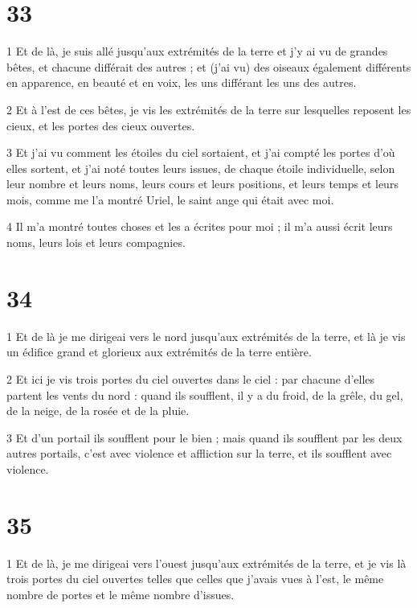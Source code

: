 \chapter{33}

\par 1 Et de là, je suis allé jusqu'aux extrémités de la terre et j'y ai vu de grandes bêtes, et chacune différait des autres ; et (j'ai vu) des oiseaux également différents en apparence, en beauté et en voix, les uns différant les uns des autres.
\par 2 Et à l'est de ces bêtes, je vis les extrémités de la terre sur lesquelles reposent les cieux, et les portes des cieux ouvertes.
\par 3 Et j'ai vu comment les étoiles du ciel sortaient, et j'ai compté les portes d'où elles sortent, et j'ai noté toutes leurs issues, de chaque étoile individuelle, selon leur nombre et leurs noms, leurs cours et leurs positions, et leurs temps et leurs mois, comme me l'a montré Uriel, le saint ange qui était avec moi.
\par 4 Il m'a montré toutes choses et les a écrites pour moi ; il m'a aussi écrit leurs noms, leurs lois et leurs compagnies.

\chapter{34}

\par 1 Et de là je me dirigeai vers le nord jusqu'aux extrémités de la terre, et là je vis un édifice grand et glorieux aux extrémités de la terre entière.
\par 2 Et ici je vis trois portes du ciel ouvertes dans le ciel : par chacune d'elles partent les vents du nord : quand ils soufflent, il y a du froid, de la grêle, du gel, de la neige, de la rosée et de la pluie.
\par 3 Et d'un portail ils soufflent pour le bien ; mais quand ils soufflent par les deux autres portails, c'est avec violence et affliction sur la terre, et ils soufflent avec violence.

\chapter{35}

\par 1 Et de là, je me dirigeai vers l'ouest jusqu'aux extrémités de la terre, et je vis là trois portes du ciel ouvertes telles que celles que j'avais vues à l'est, le même nombre de portes et le même nombre d'issues.

